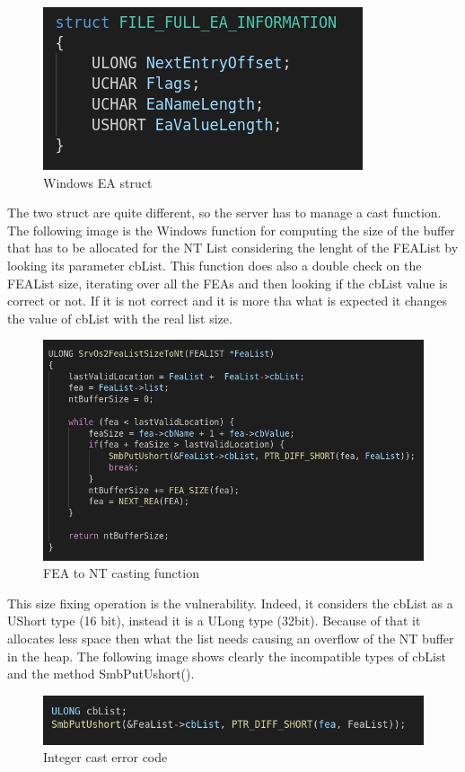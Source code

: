 \begin{figure}[ht!]
  \centering
    \includegraphics[scale=0.5]{images/windows_ea_struct.png}
    \caption{Windows EA struct}
\end{figure}
\noindent The two struct are quite different, so the server has to manage a cast function.\\
\noindent The following image is the Windows function for computing the size of the buffer that has to be allocated for the NT List considering
the lenght of the FEAList by looking its parameter cbList.
This function does also a double check on the FEAList size, iterating over all the FEAs and then looking if the cbList value is correct or not.
If it is not correct and it is more tha what is expected it changes the value of cbList with the real list size.

\begin{figure}[ht!]
  \centering
    \includegraphics[scale=0.5]{images/SrvOs2FeaListSizeToNt.png}
    \caption{FEA to NT casting function}
\end{figure}

\noindent This size fixing operation is the vulnerability.
Indeed, it considers the cbList as a UShort type (16 bit), instead it is a ULong type (32bit).
Because of that it allocates less space then what the list needs causing an overflow of the NT buffer in the heap.
The following image shows clearly the incompatible types of cbList and the method SmbPutUshort().
\begin{figure}[ht!]
  \centering
    \includegraphics[scale=0.5]{images/vulnerable_lines.png}
    \caption{Integer cast error code}
\end{figure}

